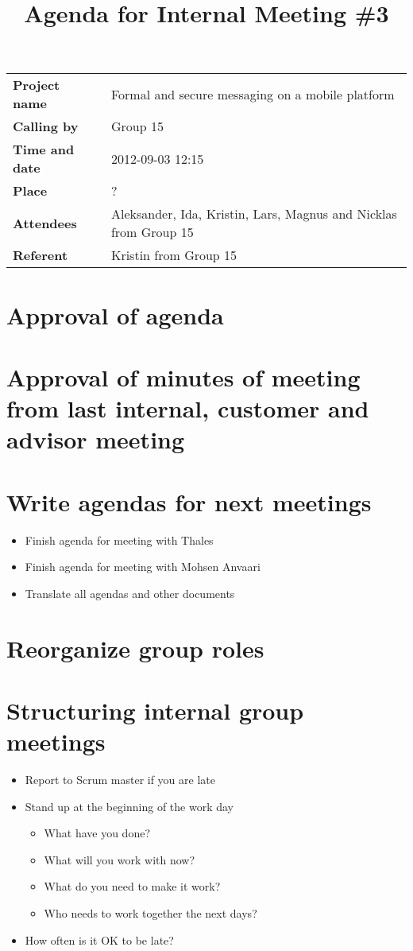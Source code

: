 \documentclass[a4paper,12pt]{article}
\begin{document}
\title{Agenda for Internal Meeting \#3}
\maketitle
\begin{tabular}{>{\bfseries}l l}	
Project name&Formal and secure messaging on a mobile platform\\
Calling by&Group 15\\
Time and date&2012-09-03 12:15\\
Place&?\\
Attendees&Aleksander, Ida, Kristin, Lars, Magnus and Nicklas from Group 15\\
Referent&Kristin from Group 15\\
\end{tabular}

\section{Approval of agenda}
\section{Approval of minutes of meeting from last internal, customer and advisor meeting}
\section{Write agendas for next meetings}
\begin{itemize}
\item
Finish agenda for meeting with Thales
\item
Finish agenda for meeting with Mohsen Anvaari
\item
Translate all agendas and other documents
\end{itemize}
\section{Reorganize group roles}
\section{Structuring internal group meetings}
\begin{itemize}
\item
Report to Scrum master if you are late
\item
Stand up at the beginning of the work day
\begin{itemize}
\item
What have you done?
\item
What will you work with now? 
\item
What do you need to make it work?
\item
Who needs to work together the next days?
\end{itemize}
\item
How often is it OK to be late?
\end{itemize}
\end{document}
